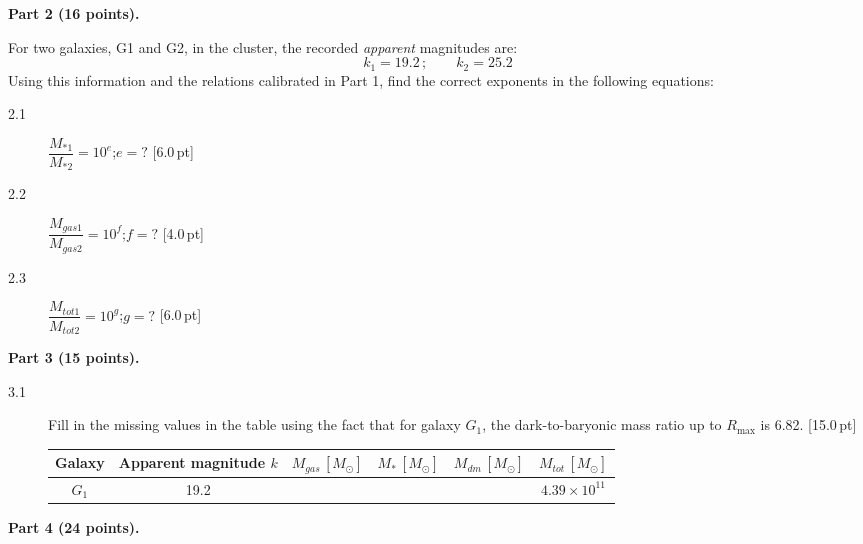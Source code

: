 \medskip
\textbf{Part 2 (16 points).}

For two galaxies, G1 and G2, in the cluster, the recorded \emph{apparent}
magnitudes are:
\[ k_1 = 19.2\,;\qquad k_2 = 25.2 \]
Using this information and the relations calibrated in Part 1, find the
correct exponents in the following equations:

\begin{description}
\item[2.1] $\dfrac{M_{*1}}{M_{*2}} = 10^e$;\quad $e = ?$ \hfill[6.0\,pt]
\item[2.2] $\dfrac{M_{gas1}}{M_{gas2}} = 10^f$;\quad $f = ?$ \hfill[4.0\,pt]
\item[2.3] $\dfrac{M_{tot1}}{M_{tot2}} = 10^g$;\quad $g = ?$ \hfill[6.0\,pt]
\end{description}

\medskip
\textbf{Part 3 (15 points).}

\begin{description}
\item[3.1] Fill in the missing values in the table using the fact that for
  galaxy $G_1$, the dark-to-baryonic mass ratio up to $R_{\max}$ is 6.82.
  \hfill[15.0\,pt]

  \begin{center}
  \begin{tabular}{cccccc}
  Galaxy & Apparent magnitude $k$ & $M_{gas}\,[M_\odot]$ & $M_*\,[M_\odot]$ &
  $M_{dm}\,[M_\odot]$ & $M_{tot}\,[M_\odot]$ \\
  \hline
  $G_1$ & 19.2 & & & & $4.39 \times 10^{11}$ \\
  \end{tabular}
  \end{center}
\end{description}

\medskip
\textbf{Part 4 (24 points).}


